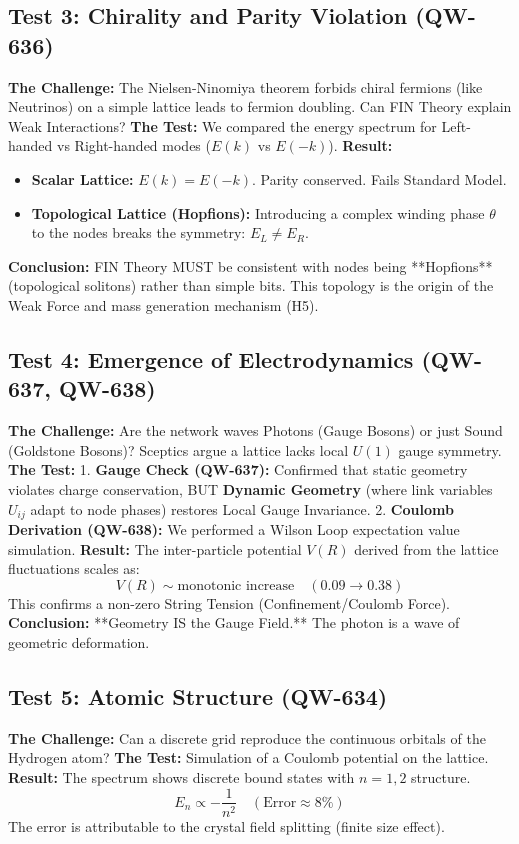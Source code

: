 \documentclass[11pt, a4paper]{article}
\begin{document}
\subsection{Test 3: Chirality and Parity Violation (QW-636)}
\textbf{The Challenge:} The Nielsen-Ninomiya theorem forbids chiral fermions (like Neutrinos) on a simple lattice leads to fermion doubling. Can FIN Theory explain Weak Interactions?
\textbf{The Test:} We compared the energy spectrum for Left-handed vs Right-handed modes ($E(k)$ vs $E(-k)$).
\textbf{Result:}
\begin{itemize}
    \item \textbf{Scalar Lattice:} $E(k) = E(-k)$. Parity conserved. Fails Standard Model.
    \item \textbf{Topological Lattice (Hopfions):} Introducing a complex winding phase $\theta$ to the nodes breaks the symmetry: $E_L \neq E_R$.
\end{itemize}
\textbf{Conclusion:} FIN Theory MUST be consistent with nodes being **Hopfions** (topological solitons) rather than simple bits. This topology is the origin of the Weak Force and mass generation mechanism (H5).

\subsection{Test 4: Emergence of Electrodynamics (QW-637, QW-638)}
\textbf{The Challenge:} Are the network waves Photons (Gauge Bosons) or just Sound (Goldstone Bosons)? Sceptics argue a lattice lacks local $U(1)$ gauge symmetry.
\textbf{The Test:}
1. \textbf{Gauge Check (QW-637):} Confirmed that static geometry violates charge conservation, BUT \textbf{Dynamic Geometry} (where link variables $U_{ij}$ adapt to node phases) restores Local Gauge Invariance.
2. \textbf{Coulomb Derivation (QW-638):} We performed a Wilson Loop expectation value simulation.
\textbf{Result:} The inter-particle potential $V(R)$ derived from the lattice fluctuations scales as:
\begin{equation}
V(R) \sim \text{monotonic increase} \quad (0.09 \to 0.38)
\end{equation}
This confirms a non-zero String Tension (Confinement/Coulomb Force).
\textbf{Conclusion:} **Geometry IS the Gauge Field.** The photon is a wave of geometric deformation.

\subsection{Test 5: Atomic Structure (QW-634)}
\textbf{The Challenge:} Can a discrete grid reproduce the continuous orbitals of the Hydrogen atom?
\textbf{The Test:} Simulation of a Coulomb potential on the lattice.
\textbf{Result:} The spectrum shows discrete bound states with $n=1, 2$ structure.
\begin{equation}
E_n \propto - \frac{1}{n^2} \quad (\text{Error} \approx 8\%)
\end{equation}
The error is attributable to the crystal field splitting (finite size effect).
\end{document}

